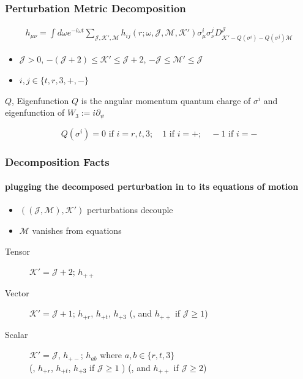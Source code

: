 \documentclass[xcolor=dvipsnames]{beamer}
\begin{document}
\begin{frame}
  \frametitle{Perturbation Metric Decomposition}

  \begin{align*}
    h_{\mu\nu} = \int d\omega e^{-i\omega t} \sum_{\mathcal{J}, \mathcal{K}', \mathcal{M}} h_{i j}(r;\omega,\mathcal{J},\mathcal{M},\mathcal{K}') \sigma^i_{\mu} \sigma^j_{\nu} D_{\mathcal{K'}-Q(\sigma^{i})-Q(\sigma^{j}) \mathcal{M}}^\mathcal{J}
  \end{align*}

  \begin{itemize}
    \item $\mathcal{J} > 0$, $-\left( \mathcal J + 2 \right) \leq \mathcal{K}' \leq \mathcal J + 2$, $-\mathcal J \leq \mathcal{M}'  \leq \mathcal J$
    \item $i, j \in \{t,r,3,+, -\}$
  \end{itemize}

  \begin{block}{$Q$, Eigenfunction}
    \alert{$Q$} is the angular momentum quantum charge of $\sigma^i$ and eigenfunction of $W_3 := i\partial_\psi$

    \begin{equation*}
      Q(\sigma^i) = 0 \text{ if } i=r,t,3;\quad 1 \text{ if } i=+;\quad -1 \text{ if } i=- 
    \end{equation*}
  \end{block}

\end{frame}

\begin{frame}
  \frametitle{Decomposition Facts}
  \framesubtitle{plugging the decomposed perturbation in to its equations of motion}

  \begin{itemize}
    \item $((\mathcal J, \mathcal M), \mathcal K')$ perturbations decouple
    \item $\mathcal M$ vanishes from equations
  \end{itemize}

  \vfill

  \begin{description}
    \item[Tensor]
      \(\mathcal K' = \mathcal J + 2\); \(h_{++}\)
    \item[Vector]
      \(\mathcal K' = \mathcal J + 1\); \(h_{+r}\), \(h_{+t}\), \(h_{+3}\) (,
      and \(h_{++}\) if \(\mathcal J \geq 1\))
    \item[Scalar]
      \(\mathcal K' = \mathcal J\), \(h_{+-}\); \(h_{ab}\) where
      \(a,b \in \{r,t,3\}\)\\
      (, \(h_{+r}\), \(h_{+t}\), \(h_{+3}\) if \(\mathcal J \geq 1\) ) (, and
      \(h_{++}\) if \(\mathcal J \geq 2\))
  \end{description}
\end{frame}
\end{document}
